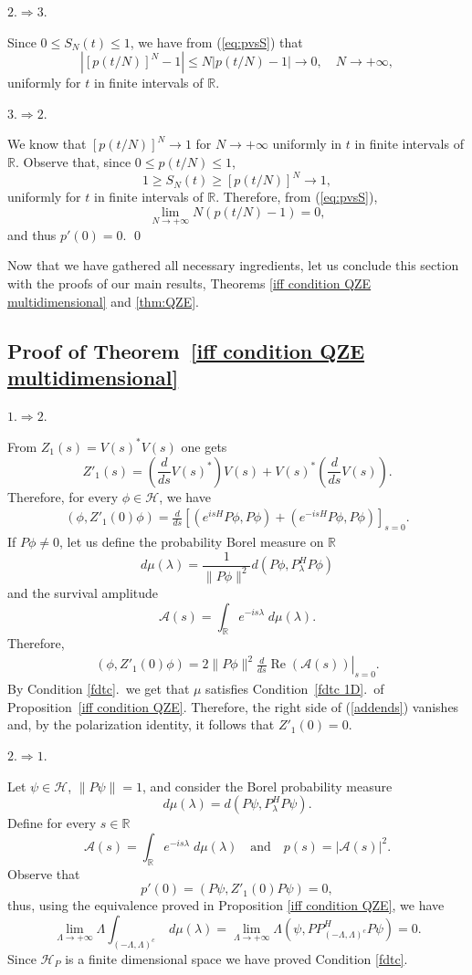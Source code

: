 \documentclass[aip,jmp,12pt
]{revtex4}
\renewcommand{\Re}{\mathop{\mathrm{Re}}\nolimits}
\newcommand{\RM}{\mathbb{R}}
\theoremstyle{definition}
\begin{document}
$2. \Rightarrow 3.$

Since $0 \leq S_{N}(t) \leq 1$, we have from (\ref{eq:pvsS}) that
$$
\left|[p(t/N)]^N -1 \right| \leq N \left|p(t/N)-1\right| \to 0, \quad N \to +\infty,
$$
uniformly for $t$ in finite intervals of $\RM$.

$3. \Rightarrow 2.$

We know that $[p(t/N)]^N \to 1$ for $N \to +\infty$ uniformly in $t$ in finite intervals of $\RM$.
Observe that, since $0\leq p(t/N)\leq 1$,
$$
1 \geq S_{N}(t) \geq [p(t/N)]^N \to 1,
$$
uniformly for $t$ in finite intervals of $\RM$. Therefore, from (\ref{eq:pvsS}),
$$
\lim_{N \to +\infty} N\left(p(t/N)-1\right)=0,
$$
and thus $p'(0)=0$.
\qed

Now that we have gathered all necessary ingredients, let us conclude this section with the proofs of our main results,  Theorems \ref{iff condition QZE multidimensional} and \ref{thm:QZE}.


\subsection*{Proof of Theorem~\ref{iff condition QZE multidimensional}}

$1. \Rightarrow 2.$ 

From $Z_1(s)=V(s)^{*}V(s)$ one gets
\[
Z'_1(s)=\left(\frac{d}{ds}V(s)^{*}\right)V(s)+V(s)^{*}\left(\frac{d}{ds}V(s)\right).
\]
Therefore, for every $\phi \in \mathcal{H}$, we have
\begin{eqnarray*}
(\phi,Z'_1(0)\phi) =  \frac{d}{ds} \left[\left( e^{isH}P\phi, P\phi\right) +\left( e^{-isH}P\phi, P\phi \right)\right]_{s=0} .
\end{eqnarray*}
If $P\phi\neq 0$, let us define the probability Borel measure on $\RM$
\[
d\mu(\lambda)=\frac{1}{\|P \phi\|^2}d(P\phi,P_{\lambda}^H P\phi)
\]
and the survival amplitude
\[
\mathcal{A}(s)=\int_{\RM}e^{-is\lambda} \; d\mu (\lambda).
\]
Therefore,
\begin{eqnarray}\label{addends}
(\phi,Z'_1(0)\phi) =2 \|P \phi\|^2 \left.\frac{d}{ds}\Re \left( \mathcal{A}(s) \right)  \right|_{s=0} .
\end{eqnarray}
By Condition \ref{fdtc}.\ we get that $\mu$ satisfies
Condition~\ref{fdtc 1D}.\ of Proposition~\ref{iff condition QZE}. Therefore, the right side of
(\ref{addends}) vanishes and, by the polarization identity, it follows that $Z'_1(0)=0$.

$2. \Rightarrow 1.$ 

Let $\psi \in \mathcal{H}$, $\| P \psi \|= 1$, and consider the
Borel probability measure
\[
d \mu (\lambda)= d(P \psi , P_{\lambda}^H P \psi).
\]
Define for every $s \in \RM$
\[
\mathcal{A}(s)=\int_{\RM} e^{-is \lambda}\; d\mu(\lambda) \quad
\textrm{and} \quad p(s)=|\mathcal{A}(s)|^2.
\]
Observe that
\[
p'(0)=(P\psi, Z'_1(0) P \psi)=0,
\]
thus, using the equivalence proved in Proposition \ref{iff condition
QZE}, we have
\[
\lim_{\Lambda \to + \infty} \Lambda \int_{(-\Lambda,\Lambda)^c}\; d\mu(\lambda)=\lim_{\Lambda \to + \infty} \Lambda (\psi,PP^{H}_{(-\Lambda,\Lambda)^c}P\psi)=0.
\]
Since $\mathcal{H}_{P}$ is a finite dimensional space we have proved Condition \ref{fdtc}.
\end{document}
